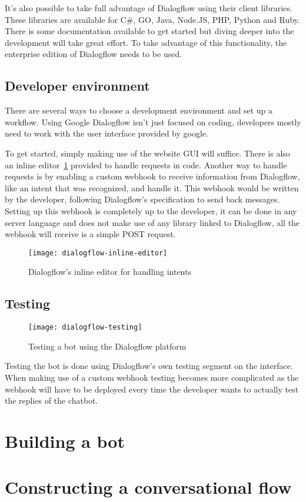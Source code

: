 It's also possible to take full advantage of Dialogflow using their client libraries. These libraries are available for C\#, GO, Java, Node.JS, PHP, Python and Ruby. There is some documentation available to get started but diving deeper into the development will take great effort. To take advantage of this functionality, the enterprise edition of Dialogflow needs to be used.

\subsection{Developer environment}

There are several ways to choose a development environment and set up a workflow. Using Google Dialogflow isn't just focused on coding, developers mostly need to work with the user interface provided by google.

To get started, simply making use of the website GUI will suffice. There is also an inline editor~\ref{fig:dialogflow-inline-editor} provided to handle requests in code. Another way to handle requests is by enabling a custom webhook to receive information from Dialogflow, like an intent that was recognized, and handle it. This webhook would be written by the developer, following Dialogflow's specification to send back messages. Setting up this webhook is completely up to the developer, it can be done in any server language and does not make use of any library linked to Dialogflow, all the webhook will receive is a simple POST request.

\begin{figure}[ht]
	\centering
	\texttt{[image: dialogflow-inline-editor]}\label{fig:dialogflow-inline-editor}
	\caption{Dialogflow's inline editor for handling intents}
\end{figure}

\subsection{Testing}

\begin{wrapfigure}{r}{0.35\textwidth}
	\texttt{[image: dialogflow-testing]}\label{fig:dialogflow-testing}
	\caption{Testing a bot using the Dialogflow platform}
\end{wrapfigure}

Testing the bot is done using Dialogflow's own testing segment on the interface. When making use of a custom webhook testing becomes more complicated as the webhook will have to be deployed every time the developer wants to actually test the replies of the chatbot.

\newpage

\section{Building a bot}

\section{Constructing a conversational flow}